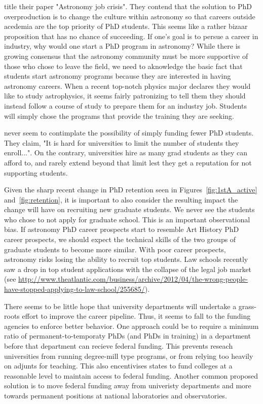 \documentclass{emulateapj}
\begin{document}
\citet{Cooray15} title their paper "Astronomy job crisis".  They contend that the solution to PhD overproduction is to change the culture within astronomy so that careers outside acedemia are the top priority of PhD students. This seems like a rather bizaar proposition that has no chance of succeeding. If one's goal is to persue a career in industry, why would one start a PhD program in astronomy? While there is growing consensus that the astronomy community must be more supportive of those who chose to leave the field, we need to aknowledge the basic fact that students start astronomy programs because they are interested in having astronomy careers.  When a recent top-notch physics major declares they would like to study astrophysics, it seems fairly patronizing to tell them they should instead follow a course of study to prepare them for an industry job. Students will simply chose the programs that provide the training they are seeking.

\citet{Cooray15} never seem to contimplate the possibility of simply funding fewer PhD students. They claim, "It is hard for universities to limit the number of students they enroll...". On the contrary, universities hire as many grad students as they can afford to, and rarely extend beyond that limit lest they get a reputation for not supporting students.  

Given the sharp recent change in PhD retention seen in Figures~\ref{fig:1stA_active} and~\ref{fig:retention}, it is important to also consider the resulting impact the change will have on recruiting new graduate students. We never see the students who chose to not apply for graduate school. This is an important observational bias.  If astronomy PhD career prospects start to resemble Art History PhD career prospects, we should expect the technical skills of the two groups of graduate students to become more similar.  With poor career prospects, astronomy risks losing the ability to recruit top students. Law schools recently saw a drop in top student applications with the collapse of the legal job market (see \url{http://www.theatlantic.com/business/archive/2012/04/the-wrong-people-have-stopped-applying-to-law-school/255685/}).  

There seems to be little hope that university departments will undertake a grass-roots effort to improve the career pipeline. Thus, it seems to fall to the funding agencies to enforce better behavior.  One approach could be to require a minimum ratio of permanent-to-temporaty PhDs (and PhDs in training) in a department before that department can recieve federal funding.  This prevents reseach universities from running degree-mill type programs, or from relying too heavily on adjunts for teaching.  This also encentivises states to fund colleges at a reasonable level to maintain access to federal funding.  Another common proposed solution is to move federal funding away from univeristy departments and more towards permanent positions at national laboratories and observatories.
\end{document}
